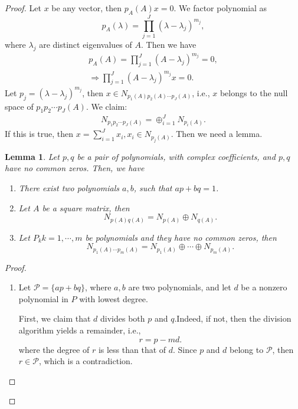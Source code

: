 \documentclass[11pt]{book}
\newtheorem{lemma}[theorem]{Lemma}
\theoremstyle{definition}
\numberwithin{equation}{chapter}
\begin{document}
\begin{proof}
Let $x$ be any vector, then $p_A(A)x = 0$. We factor polynomial as $$p_A(\lambda) = \prod^J_{j=1}\left(\lambda - \lambda_j\right)^{m_j},$$ where $\lambda_j$ are distinct eigenvalues of $A$. Then we have
\begin{align*}
    p_A(A) = \prod^J_{j=1}\left(A - \lambda_j\right)^{m_j} = 0, \\
    \Rightarrow \prod^J_{j=1}\left(A - \lambda_j\right)^{m_j}x = 0.
\end{align*}
Let $p_j = \left(\lambda - \lambda_j\right)^{m_j}$, then $x\in N_{p_1(A)p_2(A)\cdots p_J(A)}$, i.e., $x$ belongs to the null space of $p_1 p_2 \cdots p_J(A)$. We claim: 
\begin{align*}
    N_{p_1p_2\cdots p_J(A)} = \oplus^J_{i=1} N_{p_i(A)}.
\end{align*}
If this is true, then $x = \sum^J_{i=1}x_i, x_i\in N_{p_j(A)}$. Then we need a lemma.

\begin{lemma}
Let $p, q$ be a pair of polynomials, with complex coefficients, and $p,q$ have no common zeros. Then, we have
\begin{enumerate}[label=(\alph*)]
    \item There exist two polynomials $a,b$, such that $ap+bq = 1$.
    \item Let $A$ be a square matrix, then 
    $$N_{p(A)q(A)} = N_{p(A)} \oplus N_{q(A)}.$$
    \item Let $P_k k = 1, \cdots, m$ be polynomials and they have no common zeros, then 
    $$N_{p_1(A)\cdots p_m(A)} = N_{p_1(A)} \oplus\cdots\oplus N_{p_m(A)}.$$
\end{enumerate}
\end{lemma}
\begin{proof}
~\begin{enumerate}[label=(\alph*)]
    \item Let $\mathcal{P} = \{ap+bq\}$, where $a,b$ are two polynomials, and let $d$ be a nonzero polynomial in $P$ with lowest degree. 
    
    First, we claim that $d$ divides both $p$ and $q$.Indeed, if not, then the division algorithm yields a remainder, i.e.,
    $$r = p - md.$$
    where the degree of $r$ is less than that of $d$. Since $p$ and $d$ belong to $\mathcal{P}$, then $r\in \mathcal{P}$, which is a contradiction. 
    

\end{enumerate}
\end{proof}
\end{proof}
\end{document}
